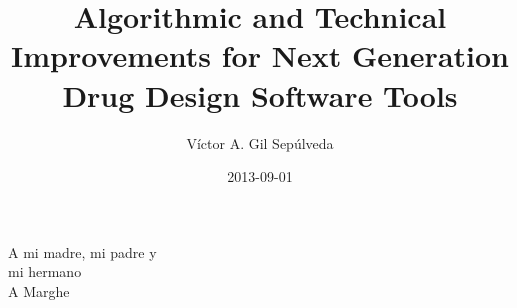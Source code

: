 \documentclass[dvipsnames, 12pt]{book}
\title{Algorithmic and Technical Improvements for Next Generation Drug Design Software Tools}
\date{2013-09-01}
\author{V\'ictor A. Gil Sep\'ulveda}
\begin{document}
\cleardoublepage%

\begin{titlepage}

\newpage
\cleardoublepage
\end{titlepage}

\begin{titlepage}

\newpage
\cleardoublepage
\end{titlepage}

\begin{dedication}
A mi madre, mi padre y\\ mi hermano\\
\smallskip
A Marghe
\end{dedication}

\newpage
\begin{spacing}{1.5}

\end{spacing}

\frontmatter
\newpage

\tableofcontents
\newpage

\listoffigures
\newpage

\listoftables
\newpage

\printglossary[type=\acronymtype,title=Abbreviations]
\newpage
\glsaddall

\mainmatter

\linespread{1.25}

\newpage


\newpage


\newpage


\newpage


\newpage


\newpage

\makeatother
\printbibliography
\end{document}
